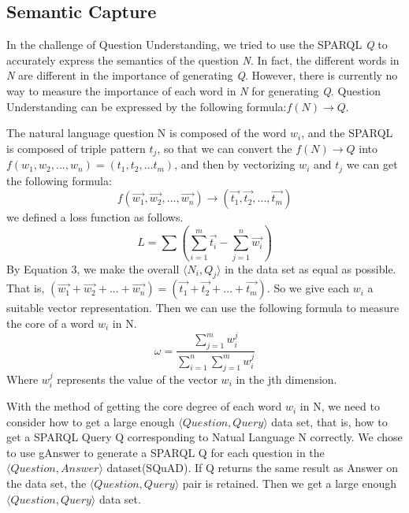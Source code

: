 \documentclass[runningheads]{llncs}
\begin{document}
\subsection{Semantic Capture}
In the challenge of Question Understanding, we tried to use the SPARQL \textit{Q} to accurately express the semantics of the question \textit{N}. In fact, the different words in \textit{N} are different in the importance of generating \textit{Q}. However, there is currently no way to measure the importance of each word in \textit{N} for generating \textit{Q}. Question Understanding can be expressed by the following formula:$f(N) \rightarrow Q$. 

The natural language question N is composed of the word $w_{i}$, and the SPARQL is composed of triple pattern $t_{j}$, so that we can convert the $f(N) \rightarrow Q$ into $f(w_{1},w_{2},...,w_{n})=(t_{1},t_{2},...t_{m})$, and then by vectorizing $w_{i}$ and $t_{j}$ we can get the following formula:
\begin{equation}
\label{e2}
f(\overrightarrow{w_{1}},\overrightarrow{w_{2}},...,\overrightarrow{w_{n}}) \rightarrow (\overrightarrow{t_{1}},\overrightarrow{t_{2}},...,\overrightarrow{t_{m}})
\end{equation}
we defined a loss function as follows.
\begin{equation}
\label{e6}
L =\sum_{}^{} (\sum_{i=1}^{m}\overrightarrow{t_{i}}-\sum_{j=1}^{n}\overrightarrow{w_{i}})
\end{equation}
By Equation 3, we make the overall $\langle N_{i}, Q_{j} \rangle$ in the data set as equal as possible. That is, $(\overrightarrow{w_{1}}+\overrightarrow{w_{2}}+...+\overrightarrow{w_{n}}) = (\overrightarrow{t_{1}}+\overrightarrow{t_{2}}+...+\overrightarrow{t_{m}})$. So we give each $w_{i}$ a suitable vector representation. Then we can use the following formula to measure the core of a word $w_{i}$ in N.
\begin{equation}
\label{e7}
\omega = \frac{\sum_{j=1}^{m}w_{i}^{j}}{\sum_{i=1}^{n} \sum_{j=1}^{m}w_{i}^{j}}
\end{equation}
Where $w_{i}^{j}$ represents the value of the vector $w_{i}$ in the jth dimension.

With the method of getting the core degree of each word $w_{i}$ in N, we need to consider how to get a large enough $\langle  Question, Query \rangle$ data set, that is, how to get a SPARQL Query Q corresponding to Natual Language N correctly.
We chose to use gAnswer to generate a SPARQL Q for each question in the $\langle Question, Answer \rangle$ dataset(SQuAD). If Q returns the same result as Answer on the data set, the $\langle Question, Query \rangle$ pair is retained. Then we get a large enough $\langle Question, Query \rangle$ data set.
\end{document}
